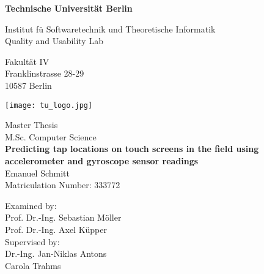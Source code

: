 \thispagestyle{empty}
\begin{center}

\vspace*{0.3cm}
{\LARGE \textbf{Technische Universität Berlin}}

\vspace{0.3cm}

{\large Institut f{\"u} Softwaretechnik und Theoretische Informatik\\[1mm]}
{\large Quality and Usability Lab\\[5mm]}

Fakultät IV\\
Franklinstrasse 28-29\\
10587 Berlin\\

\vspace*{1cm}

\texttt{[image: tu\_logo.jpg]}

\vspace*{1.0cm}

{\LARGE Master Thesis}\\
\vspace{0.3cm}
{\large M.Sc. Computer Science}\\

\vspace{0.8cm}
{\LARGE \textbf{Predicting tap locations on touch screens in the field using accelerometer and gyroscope sensor readings}}\\
\vspace*{0.8cm}
{\LARGE Emanuel Schmitt}
\\
\vspace*{0.5cm}
Matriculation Number: 333772\\
\vspace*{1.0cm}

Examined by:\\
Prof. Dr.-Ing. Sebastian Möller\\
Prof. Dr.-Ing. Axel Küpper\\
\vspace*{0.3cm}
Supervised by:\\
Dr.-Ing. Jan-Niklas Antons\\
Carola Trahms
\vspace{3cm}


\end{center}

